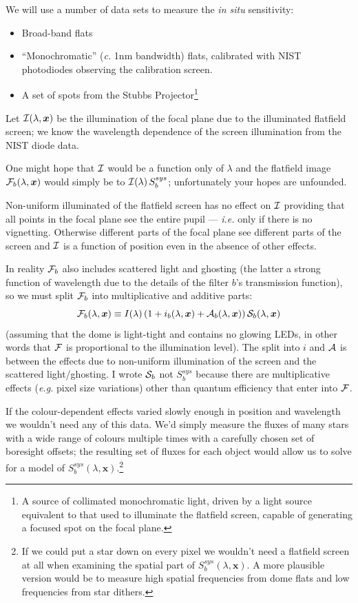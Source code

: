 \documentclass[12pt]{article}
\renewcommand{\c}{\textit{c.}\xspace}
\newcommand{\eg}{\textit{e.g.}\xspace}
\newcommand{\ie}{\textit{i.e.}\xspace}
\newcommand{\xb}{{\boldsymbol x}}
\newcommand{\Flat}{{\cal F}}
\newcommand{\screen}{{\cal I}}
\newcommand{\additive}{{\cal A}}
\newcommand{\qe}{{\cal S}}
\begin{document}
We will use a number of data sets to measure the \textit{in situ} sensitivity:
\begin{itemize}
  \item Broad-band flats
  \item ``Monochromatic'' (\c 1nm bandwidth) flats, calibrated with NIST photodiodes observing the calibration screen.
  \item A set of spots from the Stubbs Projector\footnote{
    A source of collimated monochromatic light, driven by a light source equivalent to that used to illuminate
    the flatfield screen, capable of generating a focused spot on the focal plane.  }
\end{itemize}

Let $\screen(\lambda, \xb)$ be the illumination of the focal plane due to the illuminated flatfield screen;
we know the wavelength dependence of the screen illumination from the NIST diode data.

One might hope that $\screen$ would be a function only of $\lambda$ and the flatfield image $\Flat_b(\lambda,
\xb)$ would simply be to $\screen(\lambda)\,S_b^{sys}$; unfortunately your hopes are unfounded.

Non-uniform illuminated of the flatfield screen has no effect on $\screen$ providing that all points in the
focal plane see the entire pupil --- \ie only if there is no vignetting.  Otherwise different parts of the
focal plane see different parts of the screen and $\screen$ is a function of position even in the absence of
other effects.

In reality $\Flat_b$ also includes scattered light and ghosting (the latter a strong function of wavelength
due to the details of the filter $b$'s transmission function), so we must split $\Flat_b$ into multiplicative
and additive parts:
$$
\Flat_b(\lambda, \xb) \equiv I(\lambda) \left(
                                              1 + i_b(\lambda, \xb) + \additive_b(\lambda, \xb)
                                        \right) \qe_b(\lambda, \xb)
$$
(assuming that the dome is light-tight and contains no glowing LEDs, in other words that $\Flat$ is
proportional to the illumination level).
The split into $i$ and $\additive$ is between the effects due to non-uniform illumination of the screen and
the scattered light/ghosting. I wrote $\qe_b$ not $S_b^{sys}$ because there are multiplicative
effects (\eg pixel size variations) other than quantum efficiency that enter into $\Flat$.

If the colour-dependent effects varied slowly enough in position and wavelength we wouldn't need any of this
data.  We'd simply measure the fluxes of many stars with a wide range of colours multiple times with a
carefully chosen set of boresight offsets; the resulting set of fluxes for each object would allow us to solve
for a model of $S_b^{sys}(\lambda, \xb)$.\footnote{ If we could put a star down on every pixel we wouldn't
  need a flatfield screen at all when examining the spatial part of $S_b^{sys}(\lambda, \xb)$.  A more
  plausible version would be to measure high spatial frequencies from dome flats and low frequencies from star
  dithers.}
\end{document}
